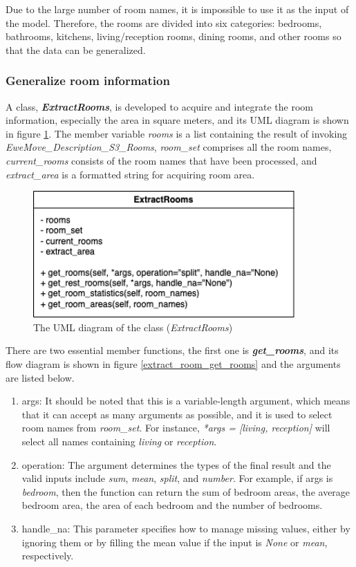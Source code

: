 \documentclass[12pt,twoside]{report}
\begin{document}
Due to the large number of room names, it is impossible to use it as the input of the model. Therefore, the rooms are divided into six categories: bedrooms, bathrooms, kitchens, living/reception rooms, dining rooms, and other rooms so that the data can be generalized. 
\\

\subsubsection{Generalize room information}
A class, \textit{\textbf{ExtractRooms}}, is developed to acquire and integrate the room information, especially the area in square meters, and its UML diagram is shown in figure \ref{uml_extract_rooms}. The member variable \textit{rooms} is a list containing the result of invoking \textit{EweMove\_Description\_S3\_Rooms}, \textit{room\_set} comprises all the room names, \textit{current\_rooms} consists of the room names that have been processed, and \textit{extract\_area} is a formatted string for acquiring room area. 
\\

\begin{figure}[!htbp]
	\centering
	\includegraphics[width=10cm]{uml_extract_rooms}
	\caption{The UML diagram of the class (\textit{ExtractRooms})}
	\label{uml_extract_rooms}
\end{figure}

There are two essential member functions, the first one is \textit{\textbf{get\_rooms}}, and its flow diagram is shown in figure \ref{extract_room_get_rooms} and the arguments are listed below. 
\begin{enumerate}
	\item args: It should be noted that this is a variable-length argument, which means that it can accept as many arguments as possible, and it is used to select room names from \textit{room\_set}. For instance, \textit{*args = [living, reception]} will select all names containing \textit{living} or \textit{reception}. 
	\item operation: The argument determines the types of the final result and the valid inputs include \textit{sum}, \textit{mean}, \textit{split}, and \textit{number}. For example, if args is \textit{bedroom}, then the function can return the sum of bedroom areas, the average bedroom area, the area of each bedroom and the number of bedrooms. 
	\item handle\_na: This parameter specifies how to manage missing values, either by ignoring them or by filling the mean value if the input is \textit{None} or \textit{mean}, respectively. 
\end{enumerate} 
\end{document}
